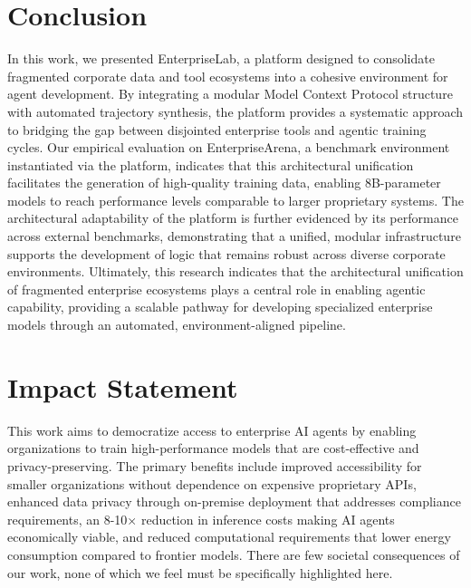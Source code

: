 \documentclass{article}
\theoremstyle{plain}
\theoremstyle{definition}
\theoremstyle{remark}
\begin{document}
\vspace{-0.2cm}
\section{Conclusion}
\vspace{-0.2cm}
In this work, we presented EnterpriseLab, a platform designed to consolidate fragmented corporate data and tool ecosystems into a cohesive environment for agent development. By integrating a modular Model Context Protocol structure with automated trajectory synthesis, the platform provides a systematic approach to bridging the gap between disjointed enterprise tools and agentic training cycles. Our empirical evaluation on EnterpriseArena, a benchmark environment instantiated via the platform, indicates that this architectural unification facilitates the generation of high-quality training data, enabling 8B-parameter models to reach performance levels comparable to larger proprietary systems. The architectural adaptability of the platform is further evidenced by its performance across external benchmarks, demonstrating that a unified, modular infrastructure supports the development of logic that remains robust across diverse corporate environments. Ultimately, this research indicates that the architectural unification of fragmented enterprise ecosystems plays a central role in enabling agentic capability, providing a scalable pathway for developing specialized enterprise models through an automated, environment-aligned pipeline.


\vspace{-0.2cm}
\section*{Impact Statement}
\label{sec:impact}
\vspace{-0.2cm}
This work aims to democratize access to enterprise AI agents by enabling organizations to train high-performance models that are cost-effective and privacy-preserving. The primary benefits include improved accessibility for smaller organizations without dependence on expensive proprietary APIs, enhanced data privacy through on-premise deployment that addresses compliance requirements, an 8-10× reduction in inference costs making AI agents economically viable, and reduced computational requirements that lower energy consumption compared to frontier models. There are few societal consequences of our work, none of which we feel must be specifically highlighted here.
\end{document}
